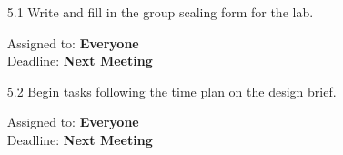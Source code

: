 \documentclass{cce2014-meetings}
\begin{document}
\begin{enumerate}

\item [5.1] Write and fill in the group scaling form for the lab.
\begin{flushright}
Assigned to: \textbf{Everyone} \\
Deadline: \textbf{Next Meeting}
\end{flushright}

\item [5.2] Begin tasks following the time plan on the design brief.
\begin{flushright}
Assigned to: \textbf{Everyone} \\
Deadline: \textbf{Next Meeting}
\end{flushright}

\end{enumerate}
\end{document}
